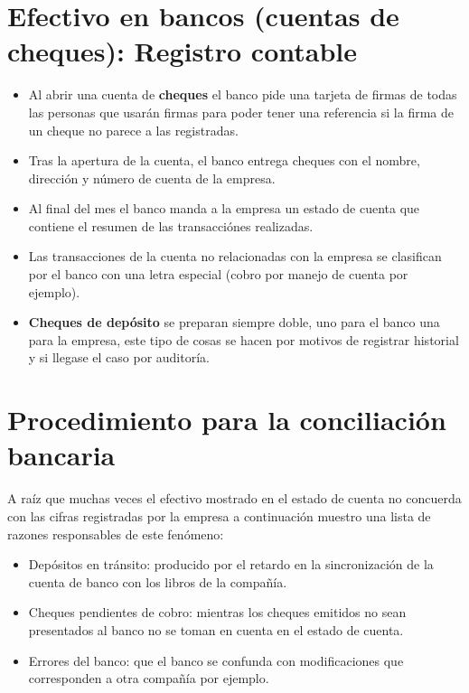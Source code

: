 \documentclass{article}
\begin{document}
\section{Efectivo en bancos (cuentas de cheques): Registro contable}
\begin{itemize}
    \item Al abrir una cuenta de \textbf{cheques} el banco pide una tarjeta de firmas de todas las personas que usarán firmas para poder tener una referencia si la firma de un cheque no parece a las registradas.
    \item Tras la apertura de la cuenta, el banco entrega cheques con el nombre, dirección y número de cuenta de la empresa.
    \item Al final del mes el banco manda a la empresa un estado de cuenta que contiene el resumen de las transacciónes realizadas.
    \item Las transacciones de la cuenta no relacionadas con la empresa se clasifican por el banco con una letra especial (cobro por manejo de cuenta por ejemplo).
    \item \textbf{Cheques de depósito} se preparan siempre doble, uno para el banco una para la empresa, este tipo de cosas se hacen por motivos de registrar historial y si llegase el caso por auditoría.
\end{itemize}

\section{Procedimiento para la conciliación bancaria}
A raíz que muchas veces el efectivo mostrado en el estado de cuenta no concuerda con las cifras registradas por la empresa a continuación muestro una lista de razones responsables de este fenómeno:
\begin{itemize}
    \item Depósitos en tránsito: producido por el retardo en la sincronización de la cuenta de banco con los libros de la compañía.
    \item Cheques pendientes de cobro: mientras los cheques emitidos no sean presentados al banco no se toman en cuenta en el estado de cuenta.
    \item Errores del banco: que el banco se confunda con modificaciones que corresponden a otra compañía por ejemplo.
\end{itemize}
\end{document}
